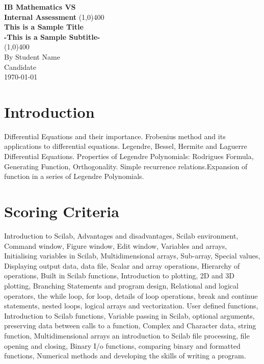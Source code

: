 \documentclass[11pt]{article}
\begin{document}
\begin{titlepage}
\begin{center}
\vspace*{1cm}
\Large{\textbf{IB Mathematics VS}}\\
\Large{\textbf{Internal Assessment}}
\vfill
\line(1,0){400}\\[1mm]
\huge{\textbf{This is a Sample Title}}\\[3mm]
\Large{\textbf{-This is a Sample Subtitle-}}\\
\line(1,0){400}\\
\vfill
By Student Name\\
Candidate\\
\today\\
\end{center}
\end{titlepage}

\section{Introduction}
Differential Equations and their importance. Frobenius method and its applications to differential equations. Legendre, Bessel, Hermite and Laguerre Differential Equations. Properties of Legendre Polynomials: Rodrigues Formula, Generating Function, Orthogonality. Simple recurrence relations.Expansion of function in a series of Legendre Polynomials.

\section{Scoring Criteria}
Introduction to Scilab, Advantages and disadvantages, Scilab environment, Command window, Figure window, Edit window, Variables and arrays, Initialising variables in Scilab, Multidimensional arrays, Sub-array, Special values, Displaying output data, data file, Scalar and array operations, Hierarchy of operations, Built in Scilab functions, Introduction to plotting, 2D and 3D plotting, Branching Statements and program design, Relational and logical operators, the while loop, for loop, details of loop operations, break and continue statements, nested loops, logical arrays and vectorization. User defined functions, Introduction to Scilab functions, Variable passing in Scilab, optional arguments, preserving data between calls to a function, Complex and Character data, string function, Multidimensional arrays an introduction to Scilab file processing, file opening and closing, Binary I/o functions, comparing binary and formatted functions, Numerical methods and developing the skills of writing a program.
\end{document}

